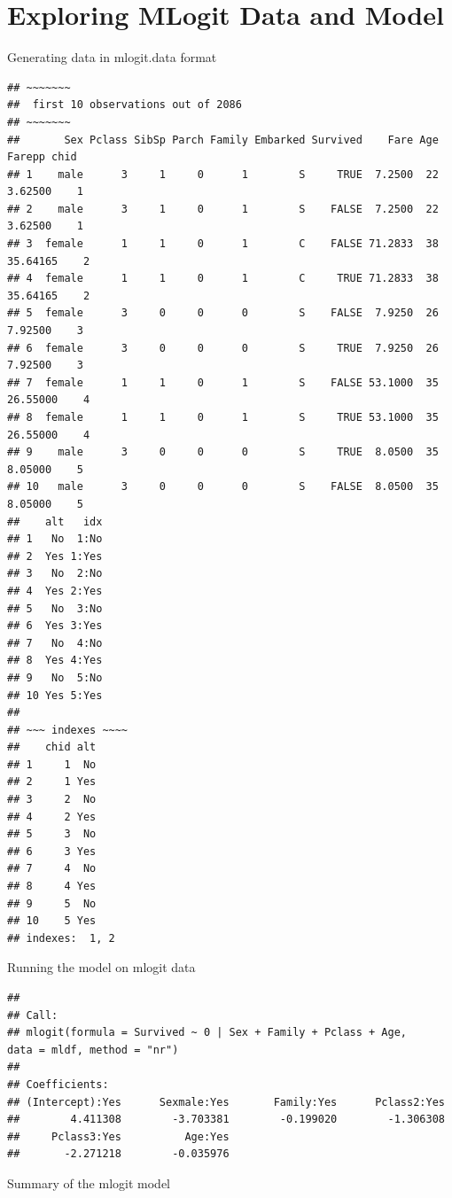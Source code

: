 \documentclass[
]{article}
\begin{document}
\hypertarget{exploring-mlogit-data-and-model}{%
\section{Exploring MLogit Data and
Model}\label{exploring-mlogit-data-and-model}}

Generating data in mlogit.data format

\begin{verbatim}
## ~~~~~~~
##  first 10 observations out of 2086 
## ~~~~~~~
##       Sex Pclass SibSp Parch Family Embarked Survived    Fare Age   Farepp chid
## 1    male      3     1     0      1        S     TRUE  7.2500  22  3.62500    1
## 2    male      3     1     0      1        S    FALSE  7.2500  22  3.62500    1
## 3  female      1     1     0      1        C    FALSE 71.2833  38 35.64165    2
## 4  female      1     1     0      1        C     TRUE 71.2833  38 35.64165    2
## 5  female      3     0     0      0        S    FALSE  7.9250  26  7.92500    3
## 6  female      3     0     0      0        S     TRUE  7.9250  26  7.92500    3
## 7  female      1     1     0      1        S    FALSE 53.1000  35 26.55000    4
## 8  female      1     1     0      1        S     TRUE 53.1000  35 26.55000    4
## 9    male      3     0     0      0        S     TRUE  8.0500  35  8.05000    5
## 10   male      3     0     0      0        S    FALSE  8.0500  35  8.05000    5
##    alt   idx
## 1   No  1:No
## 2  Yes 1:Yes
## 3   No  2:No
## 4  Yes 2:Yes
## 5   No  3:No
## 6  Yes 3:Yes
## 7   No  4:No
## 8  Yes 4:Yes
## 9   No  5:No
## 10 Yes 5:Yes
## 
## ~~~ indexes ~~~~
##    chid alt
## 1     1  No
## 2     1 Yes
## 3     2  No
## 4     2 Yes
## 5     3  No
## 6     3 Yes
## 7     4  No
## 8     4 Yes
## 9     5  No
## 10    5 Yes
## indexes:  1, 2
\end{verbatim}

Running the model on mlogit data

\begin{verbatim}
## 
## Call:
## mlogit(formula = Survived ~ 0 | Sex + Family + Pclass + Age,     data = mldf, method = "nr")
## 
## Coefficients:
## (Intercept):Yes      Sexmale:Yes       Family:Yes      Pclass2:Yes  
##        4.411308        -3.703381        -0.199020        -1.306308  
##     Pclass3:Yes          Age:Yes  
##       -2.271218        -0.035976
\end{verbatim}

Summary of the mlogit model
\end{document}
